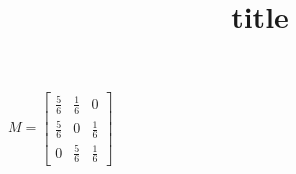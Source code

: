 \documentclass{article}
\begin{document}
\title{ {{title}} }
\maketitle

$
M = \begin{bmatrix}
       \frac{5}{6} & \frac{1}{6} & 0           \\[0.3em]
       \frac{5}{6} & 0           & \frac{1}{6} \\[0.3em]
       0           & \frac{5}{6} & \frac{1}{6}
     \end{bmatrix}
$
\end{document}

